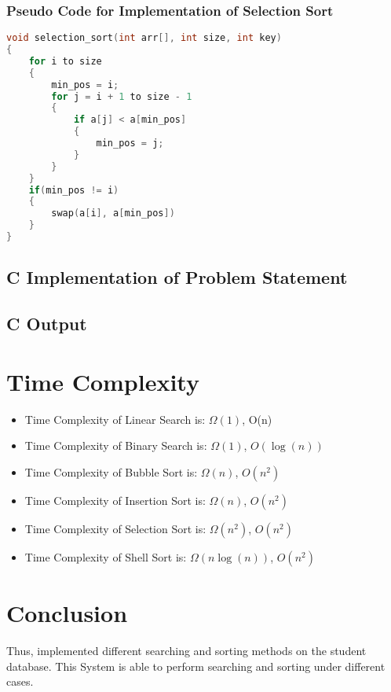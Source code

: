 \documentclass[11pt]{article}
\begin{document}
\subsubsection{Pseudo Code for Implementation of Selection Sort}
\begin{lstlisting}[language=C]
void selection_sort(int arr[], int size, int key)
{
	for i to size
	{
		min_pos = i;
		for j = i + 1 to size - 1
		{
			if a[j] < a[min_pos]
			{
				min_pos = j;
			}
		}
	}
	if(min_pos != i)
	{
		swap(a[i], a[min_pos])
	}
}
\end{lstlisting}

\subsection{C Implementation of Problem Statement}



\subsection{C Output}


\section{Time Complexity}
\begin{itemize}
	\item Time Complexity of Linear Search is: $\Omega(1)$, O(n)
	\item Time Complexity of Binary Search is: $\Omega(1)$, $O(\log(n))$
	\item Time Complexity of Bubble Sort is: $\Omega(n)$, $O(n^2)$
	\item Time Complexity of Insertion Sort is: $\Omega(n)$, $O(n^2)$
	\item Time Complexity of Selection Sort is: $\Omega(n^2)$, $O(n^2)$
	\item Time Complexity of Shell Sort is: $\Omega(n \log(n))$, $O(n^2)$
\end{itemize}

\section{Conclusion}
Thus, implemented different searching and sorting methods on the student database. This System is able to perform searching and sorting under different cases.
\end{document}
